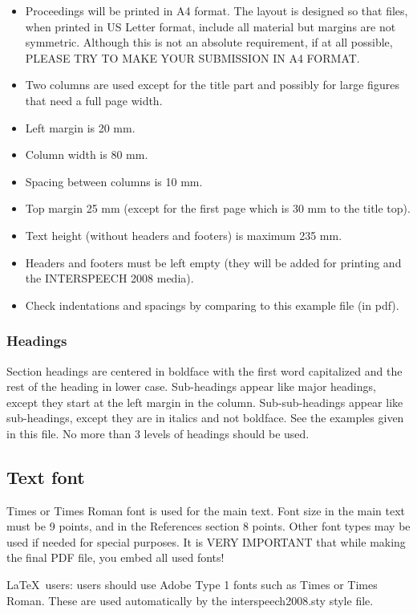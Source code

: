 \documentclass{article}
\begin{document}
\begin{itemize}
\item Proceedings will be printed in A4 format. The layout is designed 
so that files, when printed in US Letter format, include all material 
but margins are not symmetric. 
Although this is not an absolute requirement, if at all possible,
PLEASE TRY TO MAKE YOUR SUBMISSION IN A4 FORMAT.
\item Two columns are used except for the title part and possibly for large 
figures that need a full page width.
\item Left margin is 20 mm.
\item Column width is 80 mm.
\item Spacing between columns is 10 mm.
\item Top margin 25 mm (except for the first page which is 30 mm to the title top).
\item Text height (without headers and footers) is maximum 235 mm.
\item Headers and footers must be left empty (they will be added for 
printing and the INTERSPEECH 2008 media).
\item Check indentations and spacings by comparing to this 
example file (in pdf).
\end{itemize}


\subsubsection{Headings}

Section headings are centered in boldface
with the first word capitalized and the rest of the heading in 
lower case. Sub-headings appear like major headings, except they 
start at the left margin in the column.
Sub-sub-headings appear like sub-headings, except they are in italics 
and not boldface. See the examples given in this 
file. No more than 3 levels of headings should be used.

\subsection{Text font}

Times or Times Roman font is used for the main text. Font size in the main text 
must be 9 points, and in the References section 8 points. Other font
types may be used if needed for special purposes. It is VERY IMPORTANT
that while making the final PDF file, you embed all used fonts!

\LaTeX\ users: users should use Adobe Type 1 fonts such as Times or Times
Roman. These are used automatically by the interspeech2008.sty style
file.
\end{document}
